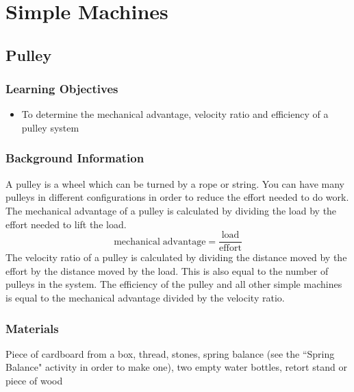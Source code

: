 \section{Simple Machines}

\subsection{Pulley}

\subsubsection*{Learning Objectives}
\begin{itemize}
\item{To determine the mechanical advantage, velocity ratio and efficiency of a pulley system}
\end{itemize}

\subsubsection*{Background Information}
A pulley is a wheel which can be turned by a rope or string.  You can have many pulleys in different configurations in order to reduce the effort needed to do work.
The mechanical advantage of a pulley is calculated by dividing the load by the effort needed to lift the load.
$$\mathrm{mechanical \;advantage} = \frac{\mathrm{load}}{\mathrm{effort}}$$
The velocity ratio of a pulley is calculated by dividing the distance moved by the effort by the distance moved by the load.  This is also equal to the number of pulleys in the system.
The efficiency of the pulley and all other simple machines is equal to the mechanical advantage divided by the velocity ratio.

\subsubsection*{Materials}
Piece of cardboard from a box, thread, stones, spring balance (see the ``Spring Balance" activity in order to make one), two empty water bottles, retort stand or piece of wood

